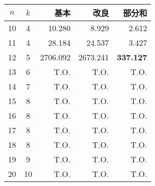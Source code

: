  \centering 
 \begin{tabular}{c|c|r|r|r} %
  $n$ & $k$ & 基本 & 改良 & 部分和 \\ \hline
  10 & 4 & 10.280 & 8.929 & 2.612 \\
  11 & 4 & 28.184 & 24.537 & 3.427 \\
  12 & 5 & 2706.092 & 2673.241 & \alert{\textbf{337.127}} \\
  13 & 6 & T.O. & T.O. & T.O. \\  
  14 & 7 & T.O. & T.O. & T.O. \\   
  15 & 8 & T.O. & T.O. & T.O. \\  
  16 & 8 & T.O. & T.O. & T.O. \\
  17 & 8 & T.O. & T.O. & T.O. \\
  18 & 8 & T.O. & T.O. & T.O. \\
  19 & 9 & T.O. & T.O. & T.O. \\
  20 & 10 & T.O. & T.O. & T.O. \\ %
 \end{tabular}